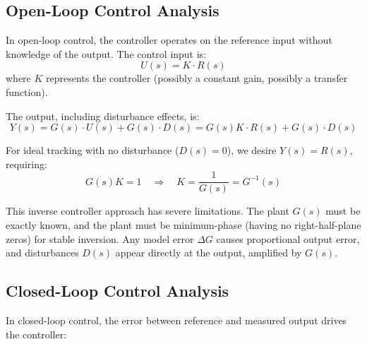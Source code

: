 \subsection{Open-Loop Control Analysis}

In open-loop control, the controller operates on the reference input without knowledge of the output. The control input is:
\begin{equation}
U(s) = K \cdot R(s)
\label{eq:openloop_control}
\end{equation}
where $K$ represents the controller (possibly a constant gain, possibly a transfer function).

The output, including disturbance effects, is:
\begin{equation}
Y(s) = G(s) \cdot U(s) + G(s) \cdot D(s) = G(s) K \cdot R(s) + G(s) \cdot D(s)
\label{eq:openloop_output}
\end{equation}

For ideal tracking with no disturbance ($D(s) = 0$), we desire $Y(s) = R(s)$, requiring:
\begin{equation}
G(s) K = 1 \quad \Rightarrow \quad K = \frac{1}{G(s)} = G^{-1}(s)
\label{eq:openloop_ideal}
\end{equation}

This inverse controller approach has severe limitations. The plant $G(s)$ must be exactly known, and the plant must be minimum-phase (having no right-half-plane zeros) for stable inversion. Any model error $\Delta G$ causes proportional output error, and disturbances $D(s)$ appear directly at the output, amplified by $G(s)$.

\subsection{Closed-Loop Control Analysis}

In closed-loop control, the error between reference and measured output drives the controller:

